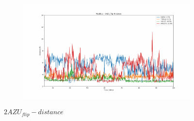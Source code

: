 \documentclass[fleqn,10pt]{wlscirep}
\begin{document}
\begin{figure}[!ht]
\begin{subfigure}{.45\textwidth}
  \end{subfigure}
    \begin{subfigure}{.45\textwidth}
     \centering
     \includegraphics[width=.95\linewidth]{2AZU_flip/2AZU_flip-dist_3.pdf}
  \end{subfigure}
\caption{$2AZU_{flip}-distance$}
\label{sup:2AZU_flip-dist}
\end{figure}  
\end{document}
